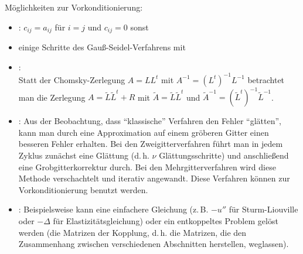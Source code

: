 \begin{Bem}
    Möglichkeiten zur Vorkonditionierung:
    \begin{itemize}
        \item
        :
        $c_{ij} = a_{ij}$ für $i = j$ und $c_{ij} = 0$ sonst

        \item
        einige Schritte des Gauß-Seidel-Verfahrens mit 

        \item
        :\\
        Statt der Chomsky-Zerlegung $A = LL^t$ mit $A^{-1} = (L^t)^{-1} L^{-1}$
        betrachtet man die Zerlegung $A = \widetilde{L}\widetilde{L}^t + R$
        mit $\widetilde{A} = \widetilde{L}\widetilde{L}^t$ und
        $\widetilde{A}^{-1} = (\widetilde{L}^t)^{-1} \widetilde{L}^{-1}$.

        \item
        :
        Aus der Beobachtung, dass "`klassische"' Verfahren den Fehler
        "`glätten"', kann man durch eine Approximation auf einem gröberen
        Gitter einen besseren Fehler erhalten.
        Bei den Zweigitterverfahren führt man in jedem Zyklus zunächst
        eine Glättung (d.\,h. $\nu$ Glättungsschritte) und anschließend
        eine Grobgitterkorrektur durch.
        Bei den Mehrgitterverfahren wird diese Methode verschachtelt und
        iterativ angewandt.
        Diese Verfahren können zur Vorkonditionierung benutzt werden.

        \item
        :
        Beispielsweise kann eine einfachere Gleichung
        (z.\,B. $-u''$ für Sturm-Liouville oder
        $-\Delta$ für Elastizitätsgleichung) oder
        ein entkoppeltes Problem gelöst werden
        (die Matrizen der Kopplung, d.\,h. die Matrizen, die den
        Zusammenhang zwischen verschiedenen Abschnitten herstellen,
        weglassen).
    \end{itemize}
\end{Bem}

\pagebreak
